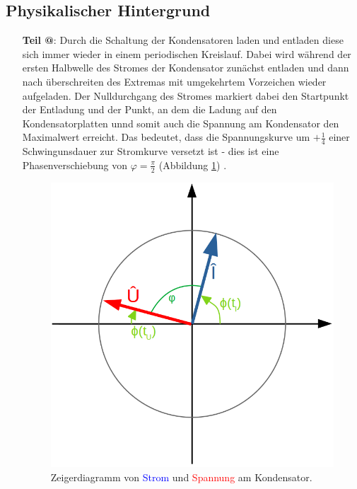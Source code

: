 \documentclass[10pt,a4paper]{article}
\makeatletter
\newcommand*{\rom}[1]{\expandafter\@slowromancap\romannumeral #1@}
\makeatother
\begin{document}
\subsection{Physikalischer Hintergrund}
\begin{flushleft}
\begin{itemize}
\item[\textbf{Teil \rom{1}}:] Durch die Schaltung der Kondensatoren laden und entladen diese sich immer wieder in einem periodischen Kreislauf. Dabei wird während der ersten Halbwelle des Stromes der Kondensator zunächst entladen und dann nach überschreiten des Extremas mit umgekehrtem Vorzeichen wieder aufgeladen. Der Nulldurchgang des Stromes markiert dabei den Startpunkt der Entladung und der Punkt, an dem die Ladung auf den Kondensatorplatten unnd somit auch die Spannung am Kondensator den Maximalwert erreicht. Das bedeutet, dass die Spannungskurve um $+\frac{1}{4}$ einer Schwingunsdauer zur Stromkurve versetzt ist - dies ist eine Phasenverschiebung von $\varphi = \frac{\pi}{2}$ (Abbildung \ref{fig:zeiger_kond}) \cite{vers9}.

\begin{figure}[H]
\centering
\includegraphics[scale=0.4]{Zeiger_kond}
\caption{Zeigerdiagramm von \textcolor{blue}{Strom} und \textcolor{red}{Spannung} am Kondensator.}
\label{fig:zeiger_kond}
\end{figure}


\end{itemize}
\end{flushleft}
\end{document}
